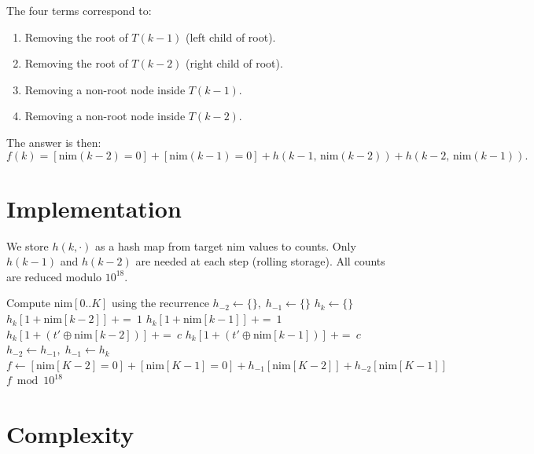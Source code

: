 \documentclass[11pt,a4paper]{article}
\begin{document}
The four terms correspond to:
\begin{enumerate}
    \item[\eqref{eq:caseA}] Removing the root of $T(k{-}1)$ (left child of root).
    \item[\eqref{eq:caseB}] Removing the root of $T(k{-}2)$ (right child of root).
    \item[\eqref{eq:caseC}] Removing a non-root node inside $T(k{-}1)$.
    \item[\eqref{eq:caseD}] Removing a non-root node inside $T(k{-}2)$.
\end{enumerate}

The answer is then:
\[
    f(k) = [\mathrm{nim}(k{-}2) = 0] + [\mathrm{nim}(k{-}1) = 0] + h(k{-}1,\, \mathrm{nim}(k{-}2)) + h(k{-}2,\, \mathrm{nim}(k{-}1)).
\]

\section{Implementation}

We store $h(k, \cdot)$ as a hash map from target nim values to counts. Only $h(k{-}1)$ and $h(k{-}2)$ are needed at each step (rolling storage). All counts are reduced modulo $10^{18}$.

\begin{algorithm}[h]
\caption{Compute $f(K) \bmod 10^{18}$}
\begin{algorithmic}[1]
\State Compute $\mathrm{nim}[0..K]$ using the recurrence
\State $h_{-2} \gets \{\},\; h_{-1} \gets \{\}$
    \State $h_k \gets \{\}$
    \State $h_k[1 + \mathrm{nim}[k{-}2]]\ {+}{=}\ 1$ 
        \State $h_k[1 + \mathrm{nim}[k{-}1]]\ {+}{=}\ 1$ 
    \EndIf
     
        \State $h_k[1 + (t' \oplus \mathrm{nim}[k{-}2])]\ {+}{=}\ c$
    \EndFor
         
            \State $h_k[1 + (t' \oplus \mathrm{nim}[k{-}1])]\ {+}{=}\ c$
        \EndFor
    \EndIf
    \State $h_{-2} \gets h_{-1},\; h_{-1} \gets h_k$
\EndFor
\State $f \gets [\mathrm{nim}[K{-}2]{=}0] + [\mathrm{nim}[K{-}1]{=}0] + h_{-1}[\mathrm{nim}[K{-}2]] + h_{-2}[\mathrm{nim}[K{-}1]]$
\State \Return $f \bmod 10^{18}$
\end{algorithmic}
\end{algorithm}

\section{Complexity}
\end{document}
